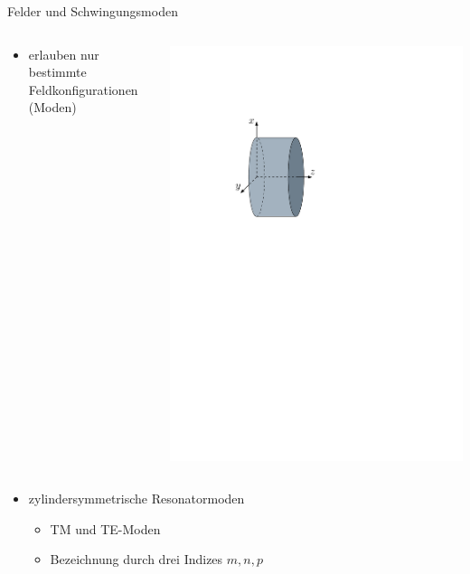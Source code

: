 \documentclass[12pt,xcolor=dvipsnames,professionalfonts]{beamer}
\begin{document}
\begin{frame}{Felder und Schwingungsmoden}
\begin{columns}[T]
\begin{itemize}
\begin{itemize}
				\item erlauben nur bestimmte Feldkonfigurationen (Moden)
			\end{itemize}
		\end{itemize}
		\centering
		\includegraphics[scale=0.6]{./figures/pillbox.pdf}
	\end{columns}
	\vfill
	\begin{itemize}
		\item zylindersymmetrische Resonatormoden
		\begin{itemize}
			\setlength\itemsep{0.25em}
			\item TM und TE-Moden
			\item Bezeichnung durch drei Indizes $m, n, p$
		\end{itemize}
		
	\end{itemize}
\end{frame}
\end{document}
